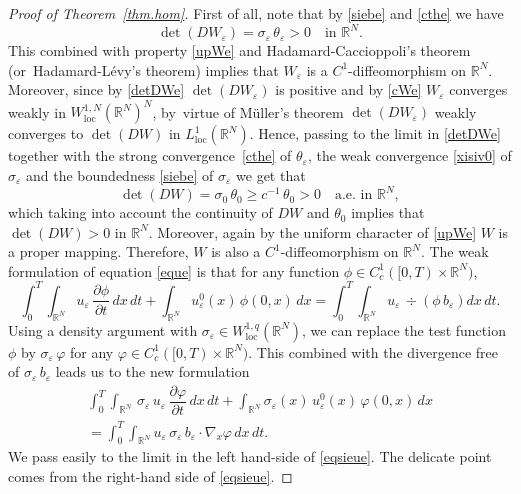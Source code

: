 \documentclass[JEP,XML,SOM,Unicode]{cedram}
\newcommand{\loc}{\mathrm{loc}}
\let \ph \varphi
\def \RR {\mathbb R}
\theoremstyle{plain}
\theoremstyle{definition}
\begin{document}
\begin{proof}[Proof of Theorem~\ref{thm.hom}]
First of all, note that by \eqref{siebe} and \eqref{cthe} we have
\begin{equation}\label{detDWe}
\det (DW_\varepsilon)=\sigma_\varepsilon\,\theta_\varepsilon>0\quad\mbox{in }\RR^N.
\end{equation}
This combined with property \eqref{upWe} and Hadamard-Caccioppoli's theorem \cite{Cac} (or~Hada\-mard-Lévy's theorem) implies that $W_\varepsilon$ is a $C^1$-diffeomorphism on $\RR^N$. Moreover, since by \eqref{detDWe} $\det(DW_\varepsilon)$ is positive and by \eqref{cWe} $W_\varepsilon$ converges weakly in $W^{1,N}_\loc(\RR^N)^N$, by~virtue of Müller's theorem \cite{Mul} $\det(DW_\varepsilon)$ weakly converges to $\det(DW)$ in $L^1_\loc(\RR^N)$. Hence, passing to the limit in \eqref{detDWe} together with the strong convergence~\eqref{cthe} of $\theta_\varepsilon$, the weak convergence \eqref{xisiv0} of $\sigma_\varepsilon$ and the boundedness \eqref{siebe} of $\sigma_\varepsilon$ we get that
\begin{equation}\label{detDW}
\det (DW)=\sigma_0\,\theta_0\geq c^{-1}\,\theta_0>0\quad\mbox{a.e. in }\RR^N,
\end{equation}
which taking into account the continuity of $DW$ and $\theta_0$ implies that $\det (DW)>0$ in $\RR^N$.
Moreover, again by the uniform character of \eqref{upWe} $W$ is a proper mapping.
Therefore, $W$ is also a $C^1$-diffeomorphism on $\RR^N$.
The weak formulation of equation \eqref{eque} is that for any function $\phi\in C^1_c([0,T)\times\RR^N)$,
\begin{equation}\label{weque}
\int_0^T\!\!\int_{\RR^N}u_\varepsilon\,\dfrac{\partial\phi}{\partial t}\,dx\,dt+\int_{\RR^N}u_\varepsilon^0(x)\,\phi(0,x)\,dx=\int_0^T\!\!\int_{\RR^N}u_\varepsilon\,\div\left(\phi\,b_\varepsilon\right)dx\,dt.
\end{equation}
Using a density argument with $\sigma_\varepsilon\in W^{1,q}_\loc(\RR^N)$, we can replace the test function $\phi$ by $\sigma_\varepsilon\,\ph$ for any $\ph\in C^1_c([0,T)\times\RR^N)$. This combined with the divergence free of $\sigma_\varepsilon\,b_\varepsilon$ leads us to the new formulation
\begin{multline}\label{eqsieue}
\int_0^T\!\!\int_{\RR^N}\,\sigma_\varepsilon\,u_\varepsilon\,\dfrac{\partial\ph}{\partial t}\,dx\,dt+\int_{\RR^N}\sigma_\varepsilon(x)\,u_\varepsilon^0(x)\,\ph(0,x)\,dx\\[-8pt]
=\int_0^T\!\!\int_{\RR^N}u_\varepsilon\,\sigma_\varepsilon\,b_\varepsilon\cdot\nabla_x\ph\,dx\,dt.
\end{multline}
We pass easily to the limit in the left hand-side of \eqref{eqsieue}. The delicate point comes from the right-hand side of \eqref{eqsieue}.


\end{proof}
\end{document}

